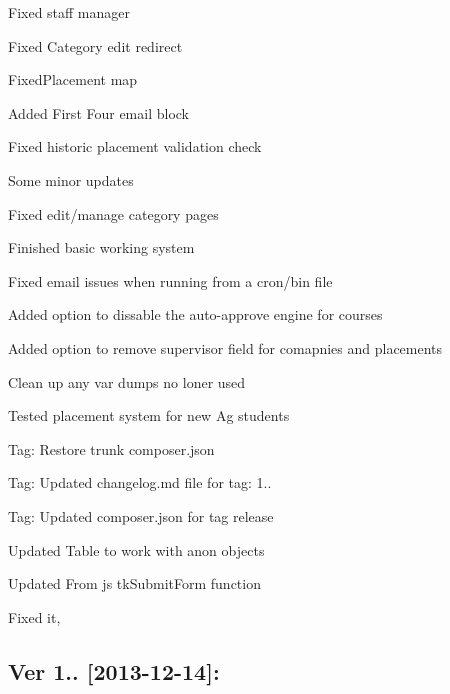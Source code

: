 \begin{DoxyItemize}
\item Fixed staff manager
\item Fixed Category edit redirect
\item Fixed\+Placement map
\item Added First Four email block
\item Fixed historic placement validation check
\item Some minor updates
\item Fixed edit/manage category pages
\item Finished basic working system
\item Fixed email issues when running from a cron/bin file
\item Added option to dissable the auto-\/approve engine for courses
\item Added option to remove supervisor field for comapnies and placements
\item Clean up any var dumps no loner used
\item Tested placement system for new Ag students
\item Tag\+: Restore trunk composer.\+json
\item Tag\+: Updated changelog.\+md file for tag\+: 1..
\item Tag\+: Updated composer.\+json for tag release
\item Updated Table to work with anon objects
\item Updated From js tk\+Submit\+Form function
\item Fixed it,
\end{DoxyItemize}

\subsection*{Ver 1.. \mbox{[}2013-\/12-\/14\mbox{]}\+: }


